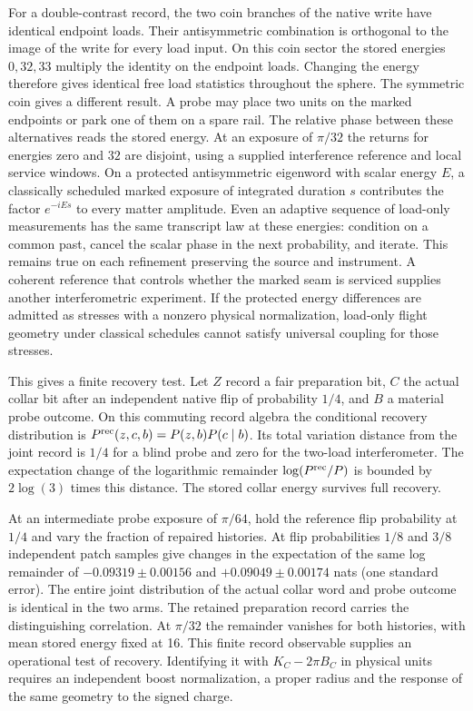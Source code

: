 \documentclass[11pt]{article}
\begin{document}
For a double-contrast record, the two coin branches of the native
write have identical endpoint loads. Their antisymmetric combination
is orthogonal to the image of the write for every load input. On
this coin sector the stored energies $0,32,33$ multiply the identity
on the endpoint loads. Changing the energy therefore gives identical
free load statistics throughout the sphere. The symmetric coin gives
a different result. A probe may place two units on the marked endpoints
or park one of them on a spare rail. The relative phase between these
alternatives reads the stored energy. At an exposure of $\pi/32$ the
returns for energies zero and $32$ are disjoint, using a supplied
interference reference and local service windows. On a protected
antisymmetric eigenword with scalar energy $E$, a classically scheduled
marked exposure of integrated duration $s$ contributes the factor
$e^{-iEs}$ to every matter amplitude. Even an adaptive sequence of
load-only measurements has the same transcript law at these energies:
condition on a common past, cancel the scalar phase in the next
probability, and iterate. This remains true on each refinement
preserving the source and instrument. A coherent reference that controls
whether the marked seam is serviced supplies another interferometric
experiment. If the protected energy differences are admitted as stresses
with a nonzero physical normalization, load-only flight geometry under
classical schedules cannot satisfy universal coupling for those stresses.

This gives a finite recovery test. Let $Z$ record a fair preparation
bit, $C$ the actual collar bit after an independent native flip of
probability $1/4$, and $B$ a material probe outcome. On this commuting
record algebra the conditional recovery distribution is
$P^{\rm rec}(z,c,b)=P(z,b)P(c\mid b)$. Its total variation distance
from the joint record is $1/4$ for a blind probe and zero for the
two-load interferometer. The expectation change of the logarithmic
remainder $\log(P^{\rm rec}/P)$ is bounded by $2\log(3)$ times this
distance. The stored collar energy survives full recovery.

At an intermediate probe exposure of $\pi/64$, hold the reference
flip probability at $1/4$ and vary the fraction of repaired histories.
At flip probabilities $1/8$ and $3/8$ independent patch samples give
changes in the expectation of the same log remainder of
$-0.09319\pm0.00156$ and $+0.09049\pm0.00174$ nats (one standard
error). The entire joint distribution of the actual collar word and
probe outcome is identical in the two arms. The retained preparation
record carries the distinguishing correlation. At $\pi/32$ the
remainder vanishes for both histories, with mean stored energy fixed at 16.
This finite record observable supplies an operational test of recovery.
Identifying it with $K_C-2\pi B_C$ in physical units requires an
independent boost normalization, a proper radius and the response of
the same geometry to the signed charge.
\end{document}
